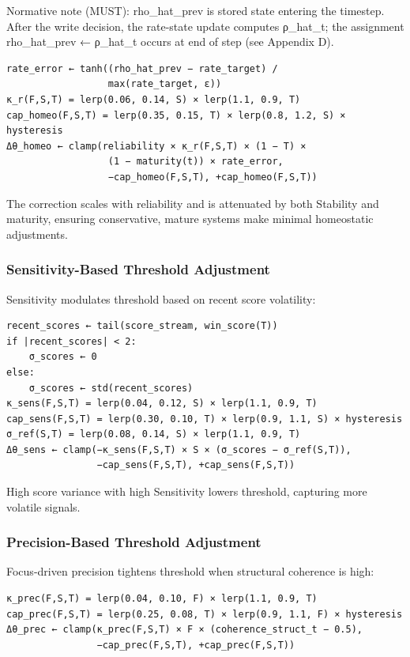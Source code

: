 \documentclass[
  letterpaper,
  DIV=11,
  numbers=noendperiod]{scrartcl}
\begin{document}
Normative note (MUST): rho\_hat\_prev is stored state entering the
timestep. After the write decision, the rate-state update computes
ρ\_hat\_t; the assignment rho\_hat\_prev ← ρ\_hat\_t occurs at end of
step (see Appendix D).

\begin{verbatim}
rate_error ← tanh((rho_hat_prev − rate_target) /
                  max(rate_target, ε))
κ_r(F,S,T) = lerp(0.06, 0.14, S) × lerp(1.1, 0.9, T)
cap_homeo(F,S,T) = lerp(0.35, 0.15, T) × lerp(0.8, 1.2, S) × hysteresis
Δθ_homeo ← clamp(reliability × κ_r(F,S,T) × (1 − T) ×
                  (1 − maturity(t)) × rate_error,
                  −cap_homeo(F,S,T), +cap_homeo(F,S,T))
\end{verbatim}

The correction scales with reliability and is attenuated by both
Stability and maturity, ensuring conservative, mature systems make
minimal homeostatic adjustments.

\subsubsection{Sensitivity-Based Threshold
Adjustment}\label{sensitivity-based-threshold-adjustment}

Sensitivity modulates threshold based on recent score volatility:

\begin{verbatim}
recent_scores ← tail(score_stream, win_score(T))
if |recent_scores| < 2:
    σ_scores ← 0
else:
    σ_scores ← std(recent_scores)
κ_sens(F,S,T) = lerp(0.04, 0.12, S) × lerp(1.1, 0.9, T)
cap_sens(F,S,T) = lerp(0.30, 0.10, T) × lerp(0.9, 1.1, S) × hysteresis
σ_ref(S,T) = lerp(0.08, 0.14, S) × lerp(1.1, 0.9, T)
Δθ_sens ← clamp(−κ_sens(F,S,T) × S × (σ_scores − σ_ref(S,T)),
                −cap_sens(F,S,T), +cap_sens(F,S,T))
\end{verbatim}

High score variance with high Sensitivity lowers threshold, capturing
more volatile signals.

\subsubsection{Precision-Based Threshold
Adjustment}\label{precision-based-threshold-adjustment}

Focus-driven precision tightens threshold when structural coherence is
high:

\begin{verbatim}
κ_prec(F,S,T) = lerp(0.04, 0.10, F) × lerp(1.1, 0.9, T)
cap_prec(F,S,T) = lerp(0.25, 0.08, T) × lerp(0.9, 1.1, F) × hysteresis
Δθ_prec ← clamp(κ_prec(F,S,T) × F × (coherence_struct_t − 0.5),
                −cap_prec(F,S,T), +cap_prec(F,S,T))
\end{verbatim}
\end{document}
